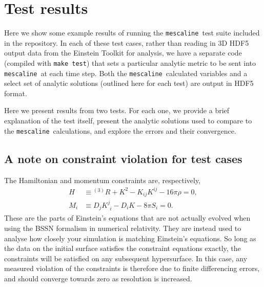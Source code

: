 \documentclass[a4paper]{article}
\newcommand{\mesc}{\texttt{mescaline}}
\begin{document}

\section{Test results}\label{sec:testresults}

Here we show some example results of running the \mesc\, test suite included in the repository. In each of these test cases, rather than reading in 3D HDF5 output data from the Einstein Toolkit for analysis, we have a separate code (compiled with \texttt{make test}) that sets a particular analytic metric to be sent into \mesc\, at each time step. Both the \mesc\, calculated variables and a select set of analytic solutions (outlined here for each test) are output in HDF5 format. 

Here we present results from two tests. For each one, we provide a brief explanation of the test itself, present the analytic solutions used to compare to the \mesc\, calculations, and explore the errors and their convergence.

\subsection{A note on constraint violation for test cases} \label{sec:constraints_in_tests}

The Hamiltonian and momentum constraints are, respectively,
\begin{align}
	H &\equiv {}^{(3)}R + K^2 - K_{ij}K^{ij} - 16\pi \rho = 0, \\
	M_i &\equiv  D_j K^j_{\phantom{j}i} - D_i K - 8\pi S_i = 0.
\end{align}
These are the parts of Einstein's equations that are not actually evolved when using the BSSN formalism \citep{baumgarte1999,shibata1995} in numerical relativity. They are instead used to analyse how closely your simulation is matching Einstein's equations. So long as the data on the initial surface satisfies the constraint equations exactly, the constraints will be satisfied on any subsequent hypersurface. In this case, any measured violation of the constraints is therefore due to finite differencing errors, and should converge towards zero as resolution is increased. 
\end{document}
